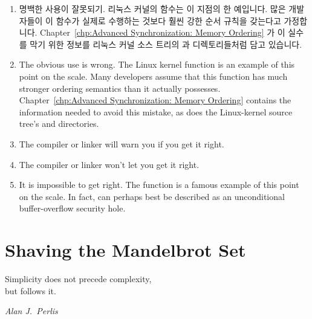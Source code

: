 \begin{enumerate}

\item	명백한 사용이 잘못되기.
	리눅스 커널의  함수는 이 지점의 한 예입니다.
	많은 개발자들이 이 함수가 실제로 수행하는 것보다 훨씬 강한 순서 규칙을
	갖는다고 가정합니다.
	Chapter~\ref{chp:Advanced Synchronization: Memory Ordering} 가 이
	실수를 막기 위한 정보를 리눅스 커널 소스 트리의
	 과  디렉토리들처럼 담고
	있습니다.

\item	The obvious use is wrong.
	The Linux kernel  function is an example of
	this point on the scale.
	Many developers assume that this function has much
	stronger ordering semantics than it actually possesses.
	Chapter~\ref{chp:Advanced Synchronization: Memory Ordering} contains the
	information needed to avoid this mistake, as does the
	Linux-kernel source tree's  and
	 directories.
\item	The compiler or linker will warn you if you get it right.
\item	The compiler or linker won't let you get it right.
\item	It is impossible to get right.
	The  function is a famous example of this point on
	the scale.
	In fact,  can perhaps best be described as
	an unconditional buffer-overflow security hole.
\end{enumerate}

\section{Shaving the Mandelbrot Set}
\label{sec:easy:Shaving the Mandelbrot Set}
%
\epigraph{Simplicity does not precede complexity, \\ but follows it.}
	 {\emph{Alan J.~Perlis}}


